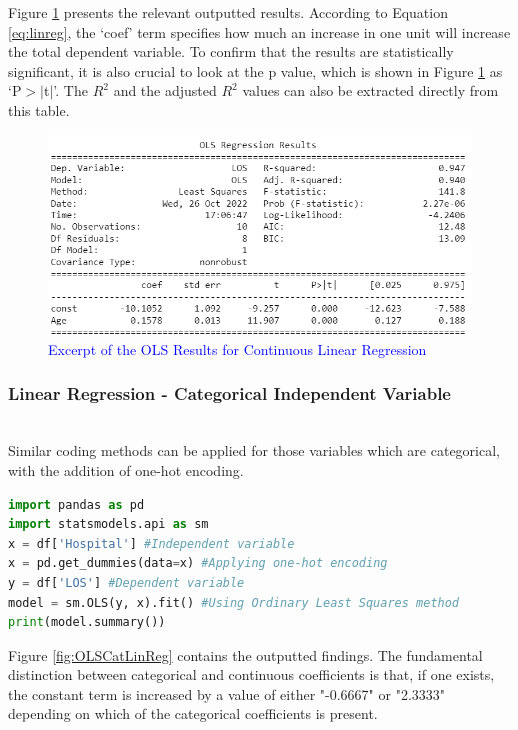 \documentclass[../thesis.tex]{subfiles}
\begin{document}
Figure \ref{fig:OLSConLinReg} presents the relevant outputted results. According to Equation \eqref{eq:linreg}, the `coef' term specifies how much an increase in one unit will increase the total dependent variable.
To confirm that the results are statistically significant, it is also crucial to look at the p value, which is shown in Figure \ref{fig:OLSConLinReg} as `P$> |$t$|$'. The $R^{2}$ and the adjusted $R^{2}$ values can also be extracted directly from this table.


\begin{figure}[h!]
    \centering
    \includegraphics{Chapters/Chapter3New/Figures/OLS Results1.png}
    \caption{\textcolor{blue}{Excerpt of the OLS Results for Continuous Linear Regression}}
    \label{fig:OLSConLinReg}
\end{figure}



\subsubsection{Linear Regression - Categorical Independent Variable}\\
Similar coding methods can be applied for those variables which are categorical, with the addition of one-hot encoding.

\begin{lstlisting}[language = python]
import pandas as pd
import statsmodels.api as sm
x = df['Hospital'] #Independent variable
x = pd.get_dummies(data=x) #Applying one-hot encoding
y = df['LOS'] #Dependent variable
model = sm.OLS(y, x).fit() #Using Ordinary Least Squares method
print(model.summary())
\end{lstlisting}

Figure \ref{fig:OLSCatLinReg} contains the outputted findings. The fundamental distinction between categorical and continuous coefficients is that, if one exists, the constant term is increased by a value of either "-0.6667" or "2.3333" depending on which of the categorical coefficients is present.
\end{document}
